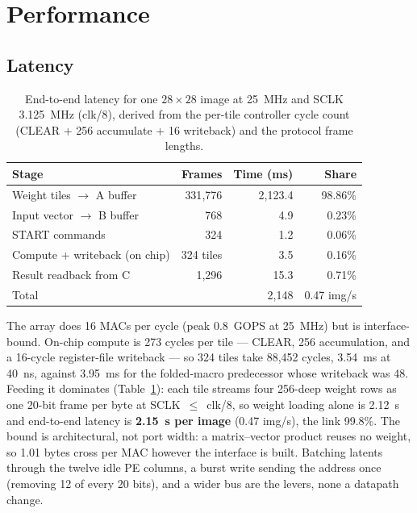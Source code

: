 \documentclass[conference,a4paper]{APSIPA2026}
\begin{document}
\section{Performance}\label{sec:perf}

\subsection{Latency}

\begin{table}[!ht]
\caption{End-to-end latency for one $28\times28$ image at 25~MHz and SCLK 3.125~MHz (clk/8), derived from the per-tile controller cycle count (CLEAR $+$ 256 accumulate $+$ 16 writeback) and the protocol frame lengths.}
\label{tab:latency}
\centering
\renewcommand{\arraystretch}{1.0}
\begin{tabular}{@{}lrrr@{}}
\toprule
Stage & Frames & Time (ms) & Share \\
\midrule
Weight tiles $\rightarrow$ A buffer & 331{,}776 & 2{,}123.4 & 98.86\% \\
Input vector $\rightarrow$ B buffer & 768       & 4.9       & 0.23\% \\
START commands                      & 324       & 1.2       & 0.06\% \\
Compute + writeback (on chip)       & 324 tiles & 3.5       & 0.16\% \\
Result readback from C              & 1{,}296   & 15.3      & 0.71\% \\
\midrule
Total                               &           & 2{,}148   & 0.47 img/s \\
\bottomrule
\end{tabular}
\end{table}
The array does 16 MACs per cycle (peak 0.8~GOPS at 25~MHz) but is interface-bound. On-chip compute is 273 cycles per tile --- CLEAR, 256 accumulation, and a 16-cycle register-file writeback --- so 324 tiles take 88{,}452 cycles, 3.54~ms at 40~ns, against 3.95~ms for the folded-macro predecessor whose writeback was 48. Feeding it dominates (Table~\ref{tab:latency}): each tile streams four 256-deep weight rows as one 20-bit frame per byte at SCLK~$\leq$~clk/8, so weight loading alone is 2.12~s and end-to-end latency is \textbf{2.15~s per image} (0.47 img/s), the link 99.8\%. The bound is architectural, not port width: a matrix--vector product reuses no weight, so 1.01 bytes cross per MAC however the interface is built. Batching latents through the twelve idle PE columns, a burst write sending the address once (removing 12 of every 20 bits), and a wider bus are the levers, none a datapath change.
\end{document}

